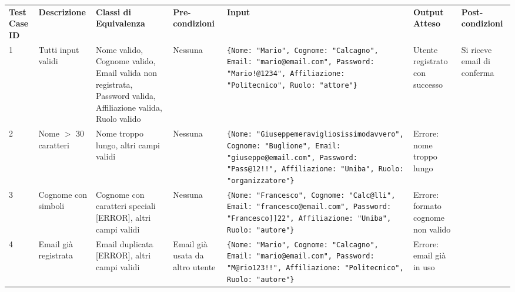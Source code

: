 \begin{sidewaystable}
\begin{tabular}{|p{3cm}|p{2cm}|p{2cm}|p{2cm}|p{4cm}|p{2cm}|p{2cm}|}
\hline
\rowcolor{SkyBlue}
\multicolumn{7}{l}{\textbf{Test Suite: Registrazione 1}} \\
\hline
\rowcolor{Red}
\textbf{Test Case ID} & \textbf{Descrizione} & \textbf{Classi di Equivalenza} & \textbf{Pre-condizioni} & \textbf{Input} & \textbf{Output Atteso} & \textbf{Post-condizioni} \\
\hline
1 & Tutti input validi & Nome valido, Cognome valido, Email valida non registrata, Password valida, Affiliazione valida, Ruolo valido & Nessuna & \texttt{\{Nome: "Mario", Cognome: "Calcagno", Email: "mario@email.com", Password: "Mario!@1234", Affiliazione: "Politecnico", Ruolo: "attore"\}} & Utente registrato con successo & Si riceve email di conferma \\
\hline
2 & Nome $>$ 30 caratteri & Nome troppo lungo, altri campi validi & Nessuna & \texttt{\{Nome: "Giuseppemeravigliosissimodavvero", Cognome: "Buglione", Email: "giuseppe@email.com", Password: "Pass@12!!", Affiliazione: "Uniba", Ruolo: "organizzatore"\}} & Errore: nome troppo lungo & \\
\hline
3 & Cognome con simboli & Cognome con caratteri speciali [ERROR], altri campi validi & Nessuna & \texttt{\{Nome: "Francesco", Cognome: "Calc@lli", Email: "francesco@email.com", Password: "Francesco]]22", Affiliazione: "Uniba", Ruolo: "autore"\}} & Errore: formato cognome non valido & \\
\hline
4 & Email già registrata & Email duplicata [ERROR], altri campi validi & Email già usata da altro utente & \texttt{\{Nome: "Mario", Cognome: "Calcagno", Email: "mario@email.com", Password: "M@rio123!!", Affiliazione: "Politecnico", Ruolo: "autore"\}} & Errore: email già in uso & \\
\hline
\end{tabular}
\end{sidewaystable}

